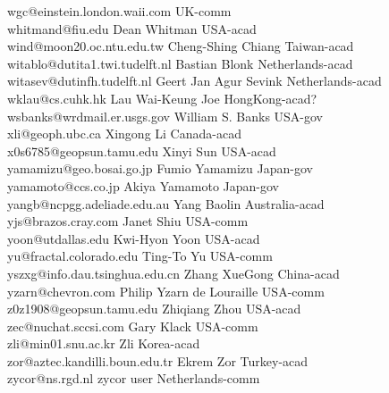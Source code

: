 \begin{tabbing}
wgc@einstein.london.waii.com \> \> UK-comm\\
whitmand@fiu.edu \> Dean Whitman \> USA-acad\\
wind@moon20.oc.ntu.edu.tw \> Cheng-Shing Chiang \> Taiwan-acad\\
witablo@dutita1.twi.tudelft.nl \> Bastian Blonk \> Netherlands-acad\\
witasev@dutinfh.tudelft.nl \> Geert Jan Agur Sevink \> Netherlands-acad\\
wklau@cs.cuhk.hk \> Lau Wai-Keung Joe \> HongKong-acad?\\
wsbanks@wrdmail.er.usgs.gov \> William S. Banks \> USA-gov\\
xli@geoph.ubc.ca \> Xingong Li \> Canada-acad\\
x0s6785@geopsun.tamu.edu \> Xinyi Sun \> USA-acad\\
yamamizu@geo.bosai.go.jp \> Fumio Yamamizu \> Japan-gov\\
yamamoto@ccs.co.jp \> Akiya Yamamoto \> Japan-gov\\
yangb@ncpgg.adeliade.edu.au \> Yang Baolin \> Australia-acad\\
yjs@brazos.cray.com \> Janet Shiu \> USA-comm\\
yoon@utdallas.edu \> Kwi-Hyon Yoon \> USA-acad\\
yu@fractal.colorado.edu \> Ting-To Yu \> USA-comm\\
yszxg@info.dau.tsinghua.edu.cn \> Zhang XueGong \> China-acad\\
yzarn@chevron.com \> Philip Yzarn de Louraille \> USA-comm\\
z0z1908@geopsun.tamu.edu \>Zhiqiang Zhou \> USA-acad\\ 
zec@nuchat.sccsi.com \> Gary Klack \> USA-comm\\
zli@min01.snu.ac.kr \> Zli \> Korea-acad\\
zor@aztec.kandilli.boun.edu.tr \> Ekrem Zor \> Turkey-acad\\
zycor@ns.rgd.nl \> zycor user \> Netherlands-comm\\
\end{tabbing}

